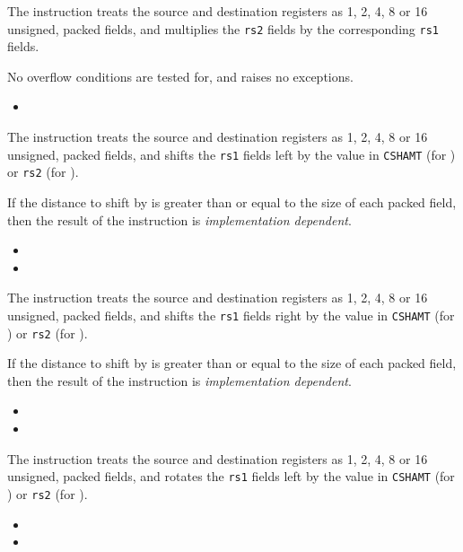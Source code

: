 {\iencmulpx}
{
The instruction  treats the source and destination registers as
1, 2, 4, 8 or 16 unsigned, packed fields, and multiplies the {\tt rs2} fields
by the corresponding {\tt rs1} fields.

No overflow conditions are tested for, and  raises no exceptions.
}{
\begin{itemize}
\item {}
\end{itemize}
}{}


{\iencsllpx\iencsllipx}
{
The instruction  treats the source and destination registers as
1, 2, 4, 8 or 16 unsigned, packed fields, and shifts the {\tt rs1} fields
left by the value in {\tt CSHAMT} (for ) or {\tt rs2} 
(for ).

If the distance to shift by is greater than or equal to the size of each
packed field, then the result of the  instruction is
{\em implementation dependent}.
}{
\begin{itemize}
\item {}
\item {}
\end{itemize}
}{}


{\iencsrlpx\iencsrlipx}
{
The instruction  treats the source and destination registers as
1, 2, 4, 8 or 16 unsigned, packed fields, and shifts the {\tt rs1} fields
right by the value in {\tt CSHAMT} (for ) or {\tt rs2} 
(for ).

If the distance to shift by is greater than or equal to the size of each
packed field, then the result of the  instruction is
{\em implementation dependent}.
}{
\begin{itemize}
\item {}
\item {}
\end{itemize}
}{}


{\iencrotpx\iencrotipx}
{
The instruction  treats the source and destination registers as
1, 2, 4, 8 or 16 unsigned, packed fields, and rotates the {\tt rs1} fields
left by the value in {\tt CSHAMT} (for ) or {\tt rs2} 
(for ).
}{
\begin{itemize}
\item {}
\item {}
\end{itemize}
}{}


